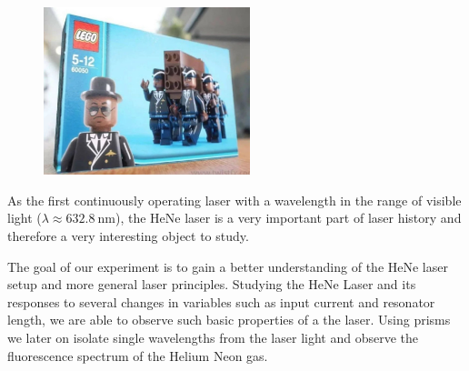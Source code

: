 \documentclass[../main.tex]{subfiles}
\begin{document}
\begin{figure}[H]
    \centering
    \includegraphics[width=6cm]{Bilddateien/CoffinDance.jpg}
    \label{fig:myfreshbild}
\end{figure}

As the first continuously operating laser with a wavelength in the range of visible light ($\lambda \approx \SI{632.8}{\nm}$), the HeNe laser is a very important part of laser history and therefore a very interesting object to study.

The goal of our experiment is to gain a better understanding of the HeNe laser setup and more general laser principles. Studying the HeNe Laser and its responses to several changes in variables such as input current and resonator length, we are able to observe such basic properties of a the laser. Using prisms we later on isolate single wavelengths from the laser light and observe the fluorescence spectrum of the Helium Neon gas.
\end{document}
